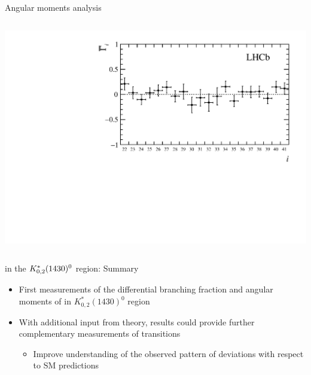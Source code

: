 \documentclass[aspectratio=1610]{beamer}
\def\Kstarfourteenthirty  {{\ensuremath{\kaon^{*}_{0,2}(1430)^{0}}}\xspace}
\begin{document}
\begin{frame}{Angular moments analysis}
\begin{columns}
\begin{column}{0.45\textwidth}
\includegraphics[height=0.44\textheight]{figs/kpimm/angular-analysis/mom_results_22_41.pdf}
\end{column}
\end{columns}
\end{frame}

\begin{frame}{\BdToKpimm in the \Kstarfourteenthirty region: Summary}

\begin{overlayarea}{\textwidth}{0.8\textheight}

\bigskip

\begin{itemize}
  \item[\ding{80}] First measurements of the differential branching fraction and angular moments of \BdToKpimm in $K^{*}_{0,2}(1430)^{0}$ region
  \item[\ding{80}] With additional input from theory, results could provide further complementary measurements of \btosll transitions
  \begin{itemize}
    \item[\ding{70}] Improve understanding of the observed pattern of deviations with respect to SM predictions
  \end{itemize}
\end{itemize}

\bigskip

\end{overlayarea}
\end{frame}
\end{document}

